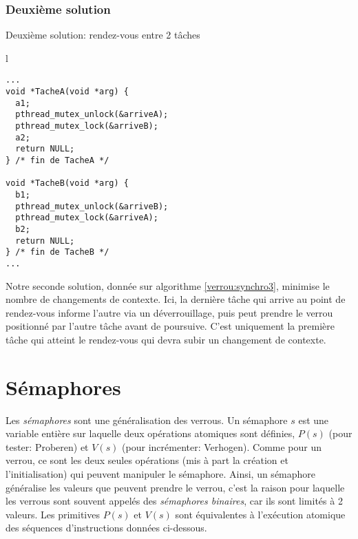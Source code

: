 \subsubsection*{Deuxième solution}
\begin{algorithm}[t]
\caption{Deuxième solution: rendez-vous entre 2 tâches}\label{verrou:synchro3}
\begin{center}
\begin{tabular}{l}
\begin{lstlisting}
...
void *TacheA(void *arg) {
  a1;
  pthread_mutex_unlock(&arriveA);
  pthread_mutex_lock(&arriveB);
  a2;
  return NULL;
} /* fin de TacheA */

void *TacheB(void *arg) {
  b1;
  pthread_mutex_unlock(&arriveB);
  pthread_mutex_lock(&arriveA);
  b2;
  return NULL;
} /* fin de TacheB */
...
\end{lstlisting}
\end{tabular}
\end{center}
\end{algorithm}
Notre seconde solution, donnée sur algorithme \ref{verrou:synchro3}, minimise le nombre de changements de contexte. Ici, la dernière tâche qui arrive au point de rendez-vous informe l'autre via un déverrouillage, puis peut prendre le verrou positionné par l'autre tâche avant de poursuive. C'est uniquement la première tâche qui atteint le rendez-vous qui devra subir un changement de contexte.

\section{Sémaphores}
Les {\em sémaphores} sont une généralisation des verrous. Un sémaphore $s$ est une variable entière sur laquelle deux opérations atomiques sont définies, $P(s)$ (pour tester: Proberen) et $V(s)$ (pour incrémenter: Verhogen). Comme pour un verrou, ce sont les deux seules opérations (mis à part la création et l'initialisation) qui peuvent manipuler le sémaphore. Ainsi, un sémaphore généralise les valeurs que peuvent prendre le verrou, c'est la raison pour laquelle les verrous sont souvent appelés des {\em sémaphores binaires}, car ils sont limités à 2 valeurs.
Les primitives $P(s)$ et $V(s)$ sont équivalentes à l'exécution atomique des séquences d'instructions données ci-dessous.

